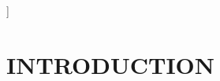 \documentclass[11pt,twocolumn]{article}
\begin{document}
\begin{@twocolumnfalse}
\begin{abstract}
\vspace{1em}
    \end{abstract}
  \end{@twocolumnfalse}
]

\section{\normalsize INTRODUCTION}\label{intro}

\end{document}
